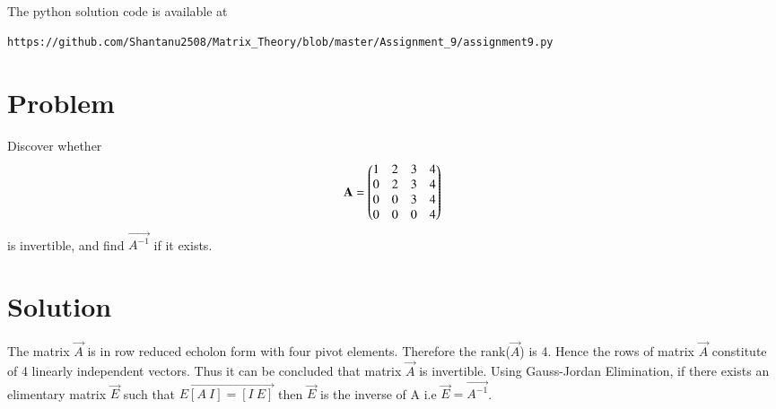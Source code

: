 \documentclass[journal,12pt,twocolumn]{IEEEtran}
\begin{document}
The python solution code is available at
\begin{lstlisting}
https://github.com/Shantanu2508/Matrix_Theory/blob/master/Assignment_9/assignment9.py
\end{lstlisting}

\section{Problem}
Discover whether
\begin{align}
	\mathbf{A}=\begin{pmatrix} 1 & 2 & 3 & 4 \\
			0 & 2 & 3 & 4 \\
			0 & 0 & 3 & 4 \\
			0 & 0 & 0 & 4\end{pmatrix}
\end{align}
is invertible, and find $\vec{A^{-1}}$ if it exists.
\section{Solution}
The matrix $\vec{A}$ is in row reduced echolon form with four pivot elements. Therefore the
rank($\vec{A}$) is 4. Hence the rows of matrix $\vec{A}$ constitute of 4 linearly independent
vectors. Thus it can be concluded that matrix $\vec{A}$ is invertible. Using Gauss-Jordan Elimination,
if there exists an elimentary matrix $\vec{E}$ such that $\vec{E[A \ I]=[I \ E]}$ then $\vec{E}$ is the inverse of A i.e $\vec{E}=\vec{A^{-1}}$.
\end{document}
